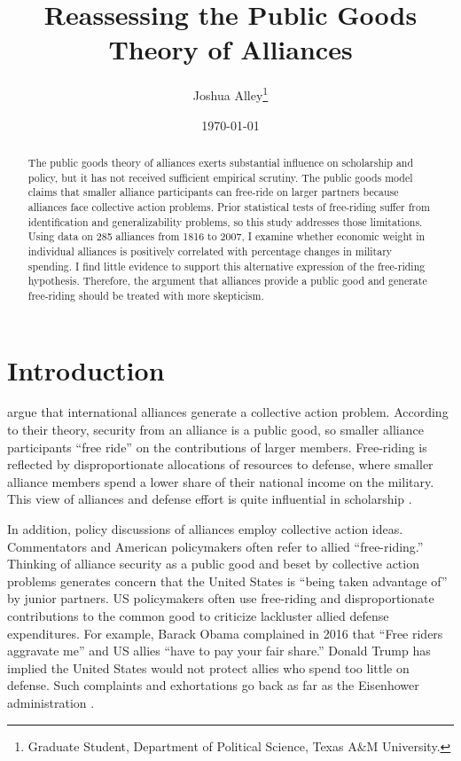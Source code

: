 \documentclass[12pt]{article}
\title{
\textbf{Reassessing the Public Goods Theory of Alliances}
	}
\author{Joshua Alley\footnote{Graduate Student,
Department of Political Science, Texas A\&M University.}}
\date{{\normalsize \today}}
\begin{document}
\maketitle 

\doublespace

\begin{abstract}
The public goods theory of alliances exerts substantial influence on scholarship and policy, but it has not received sufficient empirical scrutiny. 
The public goods model claims that smaller alliance participants can free-ride on larger partners because alliances face collective action problems. 
Prior statistical tests of free-riding suffer from identification and generalizability problems, so this study addresses those limitations. 
Using data on 285 alliances from 1816 to 2007, I examine whether economic weight in individual alliances is positively correlated with percentage changes in military spending. 
I find little evidence to support this alternative expression of the free-riding hypothesis. 
Therefore, the argument that alliances provide a public good and generate free-riding should be treated with more skepticism. 

\end{abstract} 

\newpage


\section{Introduction}



\citet{OlsonZeckhauser1966} argue that international alliances generate a collective action problem. 
According to their theory, security from an alliance is a public good, so smaller alliance participants ``free ride'' on the contributions of larger members. 
Free-riding is reflected by disproportionate allocations of resources to defense, where smaller alliance members spend a lower share of their national income on the military.
This view of alliances and defense effort is quite influential in scholarship \citep{Walt1990, Mearsheimer1994, Goldstein1995, SandlerHartley2001, Garfinkel2004, Walt2009, Norrlof2010, Barrett2010, PluemperNeumayer2015}. 


In addition, policy discussions of alliances employ collective action ideas.
Commentators and American policymakers often refer to allied ``free-riding.'' 
Thinking of alliance security as a public good and beset by collective action problems generates concern that the United States is ``being taken advantage of'' by junior partners. 
US policymakers often use free-riding and disproportionate contributions to the common good to criticize lackluster allied defense expenditures.  
For example, Barack Obama complained in 2016 that ``Free riders aggravate me'' and US allies ``have to pay your fair share.'' 
Donald Trump has implied the United States would not protect allies who spend too little on defense. 
Such complaints and exhortations go back as far as the Eisenhower administration \citep{Lanoszka2015}.
\end{document}
